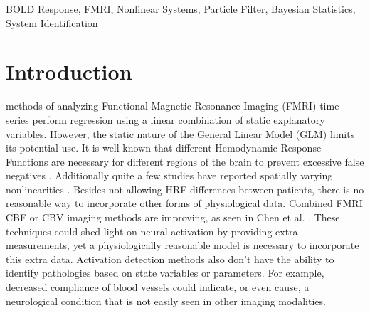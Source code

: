 \documentclass[journal]{./IEEEtran}
\begin{document}
\begin{IEEEkeywords}
BOLD Response, FMRI, Nonlinear Systems, Particle Filter, Bayesian Statistics, System Identification
\end{IEEEkeywords}

%
\IEEEpeerreviewmaketitle

\section{Introduction}
\label{sec:Introduction}
% 
% 
% 
% 
 methods of analyzing 
Functional Magnetic Resonance Imaging (FMRI)
time series perform regression using a linear 
combination of static explanatory variables. 
However, the static nature of the General Linear Model (GLM)
limits its potential use. It is well known that different 
Hemodynamic Response Functions are necessary 
for different regions of the brain to prevent excessive false
negatives \cite{Handwerker2004}. Additionally quite a few studies
have reported spatially varying nonlinearities \cite{Wager2005,Birn2001}.
Besides not allowing HRF differences between patients, there is no
reasonable way to incorporate other forms of physiological
data. Combined FMRI CBF or CBV imaging methods are improving,
as seen in Chen et al. \cite{Chen2009}. These techniques could shed light on
neural activation by providing extra measurements, yet a 
physiologically reasonable model is necessary to incorporate this extra data.
Activation detection methods also don't have the ability 
to identify pathologies based on state variables or parameters. For
example, decreased compliance of blood vessels could indicate, or 
even cause, a neurological condition that 
is not easily seen in other imaging modalities. 
\end{document}
